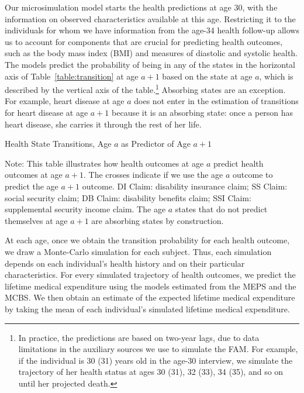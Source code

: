 Our microsimulation model starts the health predictions at age 30, with the information on observed characteristics available at this age. Restricting it to the individuals for whom we have information from the age-34 health follow-up allows us to account for components that are crucial for predicting health outcomes, such as the body mass index (BMI) and measures of diastolic and systolic health. The models predict the probability of being in any of the states in the horizontal axis of Table~\ref{table:transition} at age $a+1$ based on the state at age $a$, which is described by the vertical axis of the table.\footnote{In practice, the predictions are based on two-year lags, due to data limitations in the auxiliary sources we use to simulate the FAM. For example, if the individual is 30 (31) years old in the age-30 interview, we simulate the trajectory of her health status at ages 30 (31), 32 (33), 34 (35), and so on until her projected death.} Absorbing states are an exception. For example, heart disease at age $a$ does not enter in the estimation of transitions for heart disease at age $a+1$ because it is an absorbing state: once a person has heart disease, she carries it through the rest of her life.

\begin{table}
\begin{threeparttable}
\caption{Health State Transitions, Age $a$ as Predictor of Age $a+1$}\label{table:transition}
\scriptsize

\begin{tablenotes}
\footnotesize
\item Note: This table illustrates how health outcomes at age $a$ predict health outcomes at age $a+1$. The crosses indicate if we use the age $a$ outcome to predict the age $a+1$ outcome. DI Claim: disability insurance claim; SS Claim: social security claim; DB Claim: disability benefits claim; SSI Claim: supplemental security income claim. The age $a$ states that do not predict themselves at age $a+1$ are absorbing states by construction.
\end{tablenotes}
\end{threeparttable}
\end{table}

At each age, once we obtain the transition probability for each health outcome, we draw a Monte-Carlo simulation for each subject. Thus, each simulation depends on each individual's health history and on their particular characteristics. For every simulated trajectory of health outcomes, we predict the lifetime medical expenditure using the models estimated from the MEPS and the MCBS. We then obtain an estimate of the expected lifetime medical expenditure by taking the mean of each individual's simulated lifetime medical expenditure.


